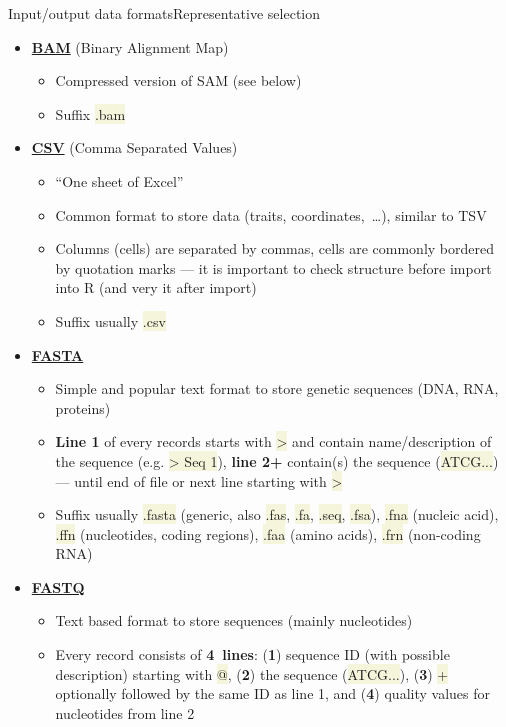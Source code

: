 \documentclass[compress, ucs, xelatex, 11pt, xcolor=svgnames, aspectratio=169,
	hyperref={
		bookmarks=true,
		unicode=true,
		colorlinks=true,
		pdftitle={Molecular data in R},
		plainpages=false,
		pdfauthor={Vojtech Zeisek},
		pdfsubject={Course about phylogeny and evolution in R},
		pdfcreator={XeLaTeX},
		pdfkeywords={R, evolution, phylogeny, molecular data},
		linkcolor=Crimson, %
		anchorcolor=Magenta, %
		citecolor=Magenta, %
		filecolor=Magenta, %
		menucolor=Magenta, %
		urlcolor=DodgerBlue, %
		pdftex},
	url={hyphens, lowtilde} %
	]{beamer}
\renewcommand{\texttt}[1]{\colorbox{Beige}{{\ttfamily #1}}}
\begin{document}
\begin{frame}[allowframebreaks]{Input/output data formats}{Representative selection}
	\begin{itemize}
		\item \href{https://en.wikipedia.org/wiki/Binary_Alignment_Map}{\textbf{BAM}} (Binary Alignment Map)
		\begin{itemize}
			\item Compressed version of SAM (see below)
			\item Suffix \texttt{*.bam}
		\end{itemize}
		\item \href{https://en.wikipedia.org/wiki/Comma-separated_values}{\textbf{CSV}} (Comma Separated Values)
		\begin{itemize}
			\item \enquote{One sheet of Excel}
			\item Common format to store data (traits, coordinates,~\ldots), similar to TSV
			\item Columns (cells) are separated by commas, cells are commonly bordered by quotation marks --- it is important to check structure before import into R (and very it after import)
			\item Suffix usually \texttt{*.csv}
		\end{itemize}
		\item \href{https://en.wikipedia.org/wiki/FASTA_format}{\textbf{FASTA}}
		\begin{itemize}
			\item Simple and popular text format to store genetic sequences (DNA, RNA, proteins)
			\item \textbf{Line 1} of every records starts with \texttt{>} and contain name/description of the sequence (e.g. \texttt{> Seq 1}), \textbf{line 2+} contain(s) the sequence (\texttt{ATCG...}) --- until end of file or next line starting with \texttt{>}
			\item Suffix usually \texttt{*.fasta} (generic, also \texttt{*.fas}, \texttt{*.fa}, \texttt{*.seq}, \texttt{*.fsa}), \texttt{*.fna} (nucleic acid), \texttt{*.ffn} (nucleotides, coding regions), \texttt{*.faa} (amino acids), \texttt{*.frn} (non-coding RNA)
		\end{itemize}
		\item \href{https://en.wikipedia.org/wiki/FASTQ_format}{\textbf{FASTQ}}
		\begin{itemize}
			\item Text based format to store sequences (mainly nucleotides)
			\item Every record consists of \textbf{4~lines}: (\textbf{1}) sequence ID (with possible description) starting with \texttt{@}, (\textbf{2}) the sequence (\texttt{ATCG...}), (\textbf{3}) \texttt{+} optionally followed by the same ID as line 1, and (\textbf{4}) quality values for nucleotides from line 2

\end{itemize}
\end{itemize}
\end{frame}
\end{document}
